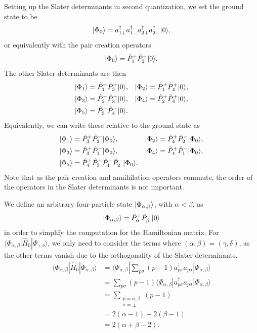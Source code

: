 Setting up the Slater determinants in second quantization, we set the ground state to be
\begin{equation*}
    \lvert\Phi_0\rangle = a_{1+}^\dagger a_{1-}^\dagger a_{2+}^\dagger a_{2-}^\dagger \lvert0\rangle,
\end{equation*}
or equivalently with the pair creation operators
\begin{equation*}
    \lvert\Phi_0\rangle = \hat{P}_1^+ \hat{P}_2^+ \lvert0\rangle.
\end{equation*}
The other Slater determinants are then
\begin{align*}
    \lvert\Phi_1\rangle &= \hat{P}_1^+ \hat{P}_3^+ \lvert0\rangle, &
    \lvert\Phi_2\rangle &= \hat{P}_1^+ \hat{P}_4^+ \lvert0\rangle, \\
    \lvert\Phi_3\rangle &= \hat{P}_2^+ \hat{P}_3^+ \lvert0\rangle, &
    \lvert\Phi_4\rangle &= \hat{P}_2^+ \hat{P}_4^+ \lvert0\rangle, \\
    \lvert\Phi_5\rangle &= \hat{P}_3^+ \hat{P}_4^+ \lvert0\rangle.
\end{align*}
Equivalently, we can write these relative to the ground state as
\begin{align*}
    \lvert\Phi_1\rangle &= \hat{P}_3^+ \hat{P}_2^- \lvert\Phi_0\rangle, &
    \lvert\Phi_2\rangle &= \hat{P}_4^+ \hat{P}_2^- \lvert\Phi_0\rangle, \\
    \lvert\Phi_3\rangle &= \hat{P}_3^+ \hat{P}_1^- \lvert\Phi_0\rangle, &
    \lvert\Phi_4\rangle &= \hat{P}_4^+ \hat{P}_1^- \lvert\Phi_0\rangle, \\
    \lvert\Phi_5\rangle &= \hat{P}_4^+ \hat{P}_3^+ \hat{P}_1^- \hat{P}_2^- \lvert\Phi_0\rangle.
\end{align*}
Note that as the pair creation and annihilation operators commute, the order of the operators in the Slater determinants is not important.

We define an arbitrary four-particle state $\lvert\Phi_{\alpha, \beta}\rangle$, with $\alpha < \beta$, as
\begin{equation*}
    \lvert\Phi_{\alpha, \beta}\rangle = \hat{P}_\alpha^+ \hat{P}_\beta^+ \lvert0\rangle
\end{equation*}
in order to simplify the computation for the Hamiltonian matrix.
For $\langle \Phi_{\alpha, \beta} | \hat{H}_0 | \Phi_{\gamma, \delta} \rangle$, we only need to consider the terms where $(\alpha, \beta) = (\gamma, \delta)$, as the other terms vanish due to the orthogonality of the Slater determinants.
\begin{align*}
    \langle \Phi_{\alpha, \beta} | \hat{H}_0 | \Phi_{\alpha, \beta} \rangle
    &= \langle \Phi_{\alpha, \beta} | \sum_{p\sigma} (p - 1) a_{p\sigma}^\dagger a_{p\sigma} | \Phi_{\alpha, \beta} \rangle \\
    &= \sum_{p\sigma} (p - 1) \langle \Phi_{\alpha, \beta} | a_{p\sigma}^\dagger a_{p\sigma} | \Phi_{\alpha, \beta} \rangle \\
    &= \sum_{\substack{p=\alpha,\beta\\ \sigma=\pm}} (p - 1) \\
    &= 2(\alpha - 1) + 2(\beta - 1) \\
    &= 2(\alpha + \beta - 2).
\end{align*}

